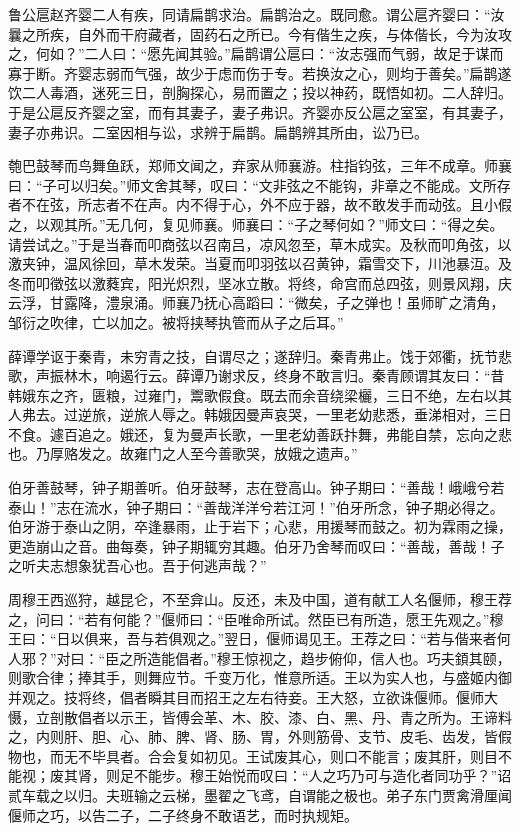 \documentclass[]{article}
\begin{document}
鲁公扈赵齐婴二人有疾，同请扁鹊求治。扁鹊治之。既同愈。谓公扈齐婴曰：``汝曩之所疾，自外而干府藏者，固药石之所已。今有偕生之疾，与体偕长，今为汝攻之，何如？''二人曰：``愿先闻其验。''扁鹊谓公扈曰：``汝志强而气弱，故足于谋而寡于断。齐婴志弱而气强，故少于虑而伤于专。若换汝之心，则均于善矣。''扁鹊遂饮二人毒酒，迷死三日，剖胸探心，易而置之；投以神药，既悟如初。二人辞归。于是公扈反齐婴之室，而有其妻子，妻子弗识。齐婴亦反公扈之室室，有其妻子，妻子亦弗识。二室因相与讼，求辨于扁鹊。扁鹊辨其所由，讼乃已。

匏巴鼓琴而鸟舞鱼跃，郑师文闻之，弃家从师襄游。柱指钧弦，三年不成章。师襄曰：``子可以归矣。''师文舍其琴，叹曰：``文非弦之不能钩，非章之不能成。文所存者不在弦，所志者不在声。内不得于心，外不应于器，故不敢发手而动弦。且小假之，以观其所。''无几何，复见师襄。师襄曰：``子之琴何如？''师文曰：``得之矣。请尝试之。''于是当春而叩商弦以召南吕，凉风忽至，草木成实。及秋而叩角弦，以激夹钟，温风徐回，草木发荣。当夏而叩羽弦以召黄钟，霜雪交下，川池暴沍。及冬而叩徵弦以激蕤宾，阳光炽烈，坚冰立散。将终，命宫而总四弦，则景风翔，庆云浮，甘露降，澧泉涌。师襄乃抚心高蹈曰：``微矣，子之弹也！虽师旷之清角，邹衍之吹律，亡以加之。被将挟琴执管而从子之后耳。''

薛谭学讴于秦青，未穷青之技，自谓尽之；遂辞归。秦青弗止。饯于郊衢，抚节悲歌，声振林木，响遏行云。薛谭乃谢求反，终身不敢言归。秦青顾谓其友曰：``昔韩娥东之齐，匮粮，过雍门，鬻歌假食。既去而余音绕梁欐，三日不绝，左右以其人弗去。过逆旅，逆旅人辱之。韩娥因曼声哀哭，一里老幼悲悉，垂涕相对，三日不食。遽百追之。娥还，复为曼声长歌，一里老幼善跃抃舞，弗能自禁，忘向之悲也。乃厚赂发之。故雍门之人至今善歌哭，放娥之遗声。''

伯牙善鼓琴，钟子期善听。伯牙鼓琴，志在登高山。钟子期曰：``善哉！峨峨兮若泰山！''志在流水，钟子期曰：``善哉洋洋兮若江河！''伯牙所念，钟子期必得之。伯牙游于泰山之阴，卒逢暴雨，止于岩下；心悲，用援琴而鼓之。初为霖雨之操，更造崩山之音。曲每奏，钟子期辄穷其趣。伯牙乃舍琴而叹曰：``善哉，善哉！子之听夫志想象犹吾心也。吾于何逃声哉？''

周穆王西巡狩，越昆仑，不至弇山。反还，未及中国，道有献工人名偃师，穆王荐之，问曰：``若有何能？''偃师曰：``臣唯命所试。然臣已有所造，愿王先观之。''穆王曰：``日以俱来，吾与若俱观之。''翌日，偃师谒见王。王荐之曰：``若与偕来者何人邪？''对曰：``臣之所造能倡者。''穆王惊视之，趋步俯仰，信人也。巧夫顉其颐，则歌合律；捧其手，则舞应节。千变万化，惟意所适。王以为实人也，与盛姬内御并观之。技将终，倡者瞬其目而招王之左右待妾。王大怒，立欲诛偃师。偃师大慑，立剖散倡者以示王，皆傅会革、木、胶、漆、白、黑、丹、青之所为。王谛料之，内则肝、胆、心、肺、脾、肾、肠、胃，外则筋骨、支节、皮毛、齿发，皆假物也，而无不毕具者。合会复如初见。王试废其心，则口不能言；废其肝，则目不能视；废其肾，则足不能步。穆王始悦而叹曰：``人之巧乃可与造化者同功乎？''诏贰车载之以归。夫班输之云梯，墨翟之飞鸢，自谓能之极也。弟子东门贾禽滑厘闻偃师之巧，以告二子，二子终身不敢语艺，而时执规矩。
\end{document}
